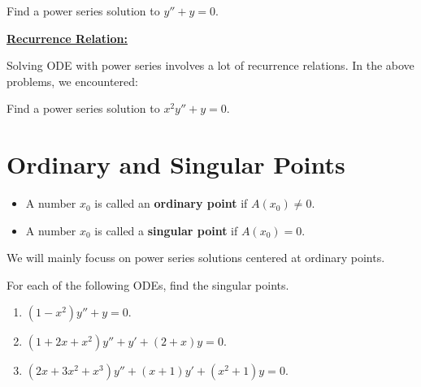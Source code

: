 \documentclass[12pt,a4paper]{article}
\newcounter{example}[section]
\begin{document}
\vspace*{16pt}

\begin{example}
Find a power series solution to $y'' + y = 0$.
\end{example}

\newpage

\phantom{2}

\newpage

\phantom{2}

\vfill

\underline{\textbf{Recurrence Relation:}}
	
Solving ODE with power series involves a lot of recurrence relations. In the above problems, we encountered:
	\vspace*{2cm}

\newpage

\begin{example}\label{Ex:SecondEx}
Find a power series solution to $x^2 y'' + y = 0$.
\end{example}

\newpage

\phantom{2}

\newpage

\section{Ordinary and Singular Points}

\begin{itemize}
\item A number $x_0$ is called an \textbf{ordinary point} if $A(x_0) \neq 0$.
\item A number $x_0$ is called a \textbf{singular point} if $A (x_0) = 0$.
\end{itemize}

We will mainly focuss on power series solutions centered at ordinary points.

\vspace*{20pt}

\begin{example}
For each of the following ODEs, find the singular points.
	\begin{enumerate}[label=\textbf{(\alph*)}]
	\item $(1 - x^2) y'' + y = 0$.
	\item $(1 + 2x + x^2) y'' + y' + (2 + x) y = 0$.
	\item $(2x + 3x^2 + x^3) y'' + (x + 1) y' + (x^2 + 1) y = 0$.
	\end{enumerate}
\end{example}
\end{document}
